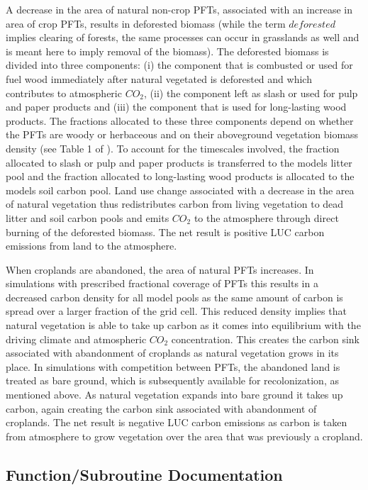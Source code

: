 A decrease in the area of natural non-\/crop P\+F\+Ts, associated with an increase in area of crop P\+F\+Ts, results in deforested biomass (while the term $\textit{deforested}$ implies clearing of forests, the same processes can occur in grasslands as well and is meant here to imply removal of the biomass). The deforested biomass is divided into three components\+: (i) the component that is combusted or used for fuel wood immediately after natural vegetated is deforested and which contributes to atmospheric $CO_2$, (ii) the component left as slash or used for pulp and paper products and (iii) the component that is used for long-\/lasting wood products. The fractions allocated to these three components depend on whether the P\+F\+Ts are woody or herbaceous and on their aboveground vegetation biomass density (see Table 1 of \cite{Arora2010-416}). To account for the timescales involved, the fraction allocated to slash or pulp and paper products is transferred to the model\textquotesingle{}s litter pool and the fraction allocated to long-\/lasting wood products is allocated to the model\textquotesingle{}s soil carbon pool. Land use change associated with a decrease in the area of natural vegetation thus redistributes carbon from living vegetation to dead litter and soil carbon pools and emits $CO_2$ to the atmosphere through direct burning of the deforested biomass. The net result is positive L\+U\+C carbon emissions from land to the atmosphere.

When croplands are abandoned, the area of natural P\+F\+Ts increases. In simulations with prescribed fractional coverage of P\+F\+Ts this results in a decreased carbon density for all model pools as the same amount of carbon is spread over a larger fraction of the grid cell. This reduced density implies that natural vegetation is able to take up carbon as it comes into equilibrium with the driving climate and atmospheric $CO_2$ concentration. This creates the carbon sink associated with abandonment of croplands as natural vegetation grows in its place. In simulations with competition between P\+F\+Ts, the abandoned land is treated as bare ground, which is subsequently available for recolonization, as mentioned above. As natural vegetation expands into bare ground it takes up carbon, again creating the carbon sink associated with abandonment of croplands. The net result is negative L\+U\+C carbon emissions as carbon is taken from atmosphere to grow vegetation over the area that was previously a cropland. 

\subsection{Function/\+Subroutine Documentation}
\hypertarget{group__landuse__change__luc_ga2c6b3a127a7a9e0357442ba402deb31b}{}
